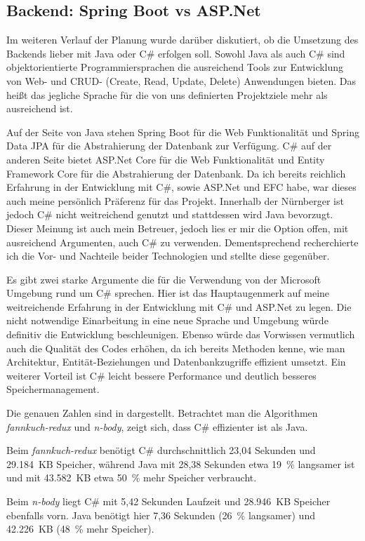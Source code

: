 \subsection{Backend: Spring Boot vs ASP.Net}
Im weiteren Verlauf der Planung wurde darüber diskutiert, ob die Umsetzung des Backends lieber mit Java oder C\# erfolgen soll. 
Sowohl Java als auch C\# sind objektorientierte Programmiersprachen die ausreichend Tools zur Entwicklung von Web- und CRUD- (Create, Read, Update, Delete) Anwendungen bieten.
Das heißt das jegliche Sprache für die von uns definierten Projektziele mehr als ausreichend ist.

Auf der Seite von Java stehen Spring Boot für die Web Funktionalität und Spring Data JPA für die Abstrahierung der Datenbank zur Verfügung.
C\# auf der anderen Seite bietet ASP.Net Core für die Web Funktionalität und Entity Framework Core für die Abstrahierung der Datenbank.
Da ich bereits reichlich Erfahrung in der Entwicklung mit C\#, sowie ASP.Net und EFC habe, war dieses auch meine persönlich Präferenz für das Projekt.
Innerhalb der Nürnberger ist jedoch C\# nicht weitreichend genutzt und stattdessen wird Java bevorzugt. Dieser Meinung ist auch mein Betreuer, jedoch lies er mir die Option offen, mit 
ausreichend Argumenten, auch C\# zu verwenden. 
Dementsprechend recherchierte ich die Vor- und Nachteile beider Technologien und stellte diese gegenüber.

Es gibt zwei starke Argumente die für die Verwendung von der Microsoft Umgebung rund um C\# sprechen.
Hier ist das Hauptaugenmerk auf meine weitreichende Erfahrung in der Entwicklung mit C\# und ASP.Net zu legen.
Die nicht notwendige Einarbeitung in eine neue Sprache und Umgebung würde definitiv die Entwicklung beschleunigen.
Ebenso würde das Vorwissen vermutlich auch die Qualität des Codes erhöhen, da ich bereits Methoden kenne, wie man Architektur, Entität-Beziehungen und Datenbankzugriffe effizient umsetzt.
Ein weiterer Vorteil ist C\# leicht bessere Performance und deutlich besseres Speichermanagement. 

Die genauen Zahlen sind in \cite{Debian2025} dargestellt. 
Betrachtet man die Algorithmen \textit{fannkuch-redux} und \textit{n-body}, zeigt sich, dass C\# effizienter ist als Java.

Beim \textit{fannkuch-redux} benötigt C\# durchschnittlich 23,04 Sekunden und 29.184~KB Speicher, 
während Java mit 28,38 Sekunden etwa 19~\% langsamer ist und mit 43.582~KB etwa 50~\% mehr Speicher verbraucht.

Beim \textit{n-body} liegt C\# mit 5,42 Sekunden Laufzeit und 28.946~KB Speicher ebenfalls vorn. 
Java benötigt hier 7,36 Sekunden (26~\% langsamer) und 42.226~KB (48~\% mehr Speicher).

